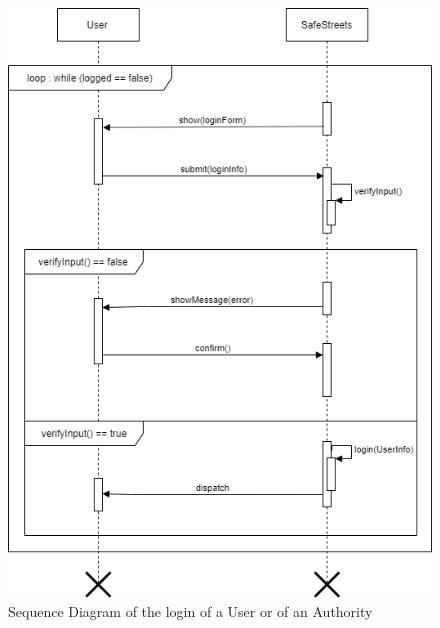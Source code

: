     \begin{figure}[H]
        \centering
        \includegraphics[scale=0.5]{Images/SeqDiag_login.png}
        \caption{Sequence Diagram of the login of a User or of an Authority}
    \end{figure}
    
